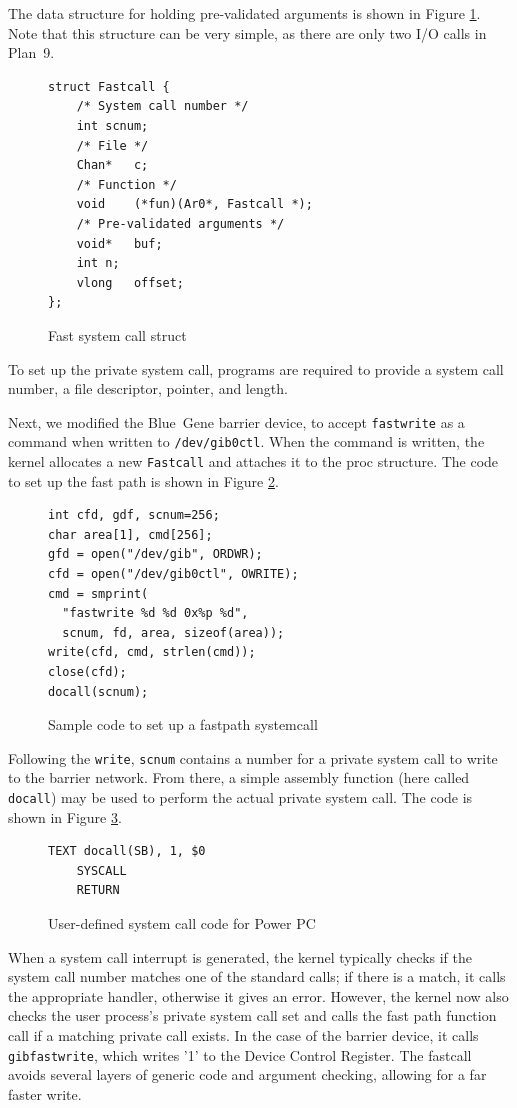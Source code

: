 \documentclass[letterpaper,twocolumn,10pt]{article}
\begin{document}
The data structure for holding pre-validated arguments is shown in Figure \ref{scstruct}. Note that this structure can be very simple, as there are only two I/O calls in Plan~9. 

\begin{figure}
\begin{verbatim}
struct Fastcall {
	/* System call number */
	int	scnum;
	/* File */
	Chan*	c;
	/* Function */
	void	(*fun)(Ar0*, Fastcall *);
	/* Pre-validated arguments */
	void*	buf;
	int	n;
	vlong	offset;
};
\end{verbatim}
\caption{\label{scstruct}Fast system call struct}
\end{figure}

To set up the private system call, programs are required to provide a system call number, a file descriptor, pointer, and length.

Next, we modified the Blue~Gene barrier device, to accept {\tt fastwrite} as a command when written to {\tt /dev/gib0ctl}. When the command is written, the kernel allocates a new {\tt Fastcall} and attaches it to the proc structure. The code to set up the fast path is shown in Figure \ref{code}.
\begin{figure}
\begin{verbatim}
int cfd, gdf, scnum=256;
char area[1], cmd[256];
gfd = open("/dev/gib", ORDWR);
cfd = open("/dev/gib0ctl", OWRITE);
cmd = smprint(
  "fastwrite %d %d 0x%p %d", 
  scnum, fd, area, sizeof(area));
write(cfd, cmd, strlen(cmd));
close(cfd);
docall(scnum);
\end{verbatim}
\caption{\label{code}Sample code to set up a fastpath systemcall}
\end{figure}

Following the {\tt write}, {\tt scnum} contains a number for a private system call to write to the barrier network. From there, a simple assembly function (here called {\tt docall}) may be used to perform the actual private system call. The code is shown in Figure \ref{docall}. 

\begin{figure}
\begin{verbatim}
TEXT docall(SB), 1, $0
    SYSCALL
    RETURN
\end{verbatim}
\caption{\label{docall}User-defined system call code for Power PC}
\end{figure}

When a system call interrupt is generated, the kernel typically checks if the system call number matches one of the standard calls; if there is a match, it calls the appropriate handler, otherwise it gives an error. However, the kernel now also checks the user process's private system call set and calls the fast path function call if a matching private call exists. In the case of the barrier device, it calls {\tt gibfastwrite}, which writes '1' to the Device Control Register. The fastcall avoids several layers of generic code and argument checking, allowing for a far faster write.
\end{document}
